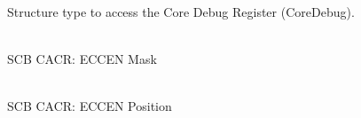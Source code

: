 \begin{DoxyRefList}
\label{deprecated__deprecated000557}%
%
Structure type to access the Core Debug Register (Core\+Debug).  
\item[{\parbox[t]{\linewidth}{Global \doxylink{group__CMSIS__SCB_ga7456a0b93710e8b9fa2b94c946e96c5c}{SCB\+\_\+\+CACR\+\_\+\+ECCEN\+\_\+\+Msk} }}]\hfill \\
\label{deprecated__deprecated000556}%
%
SCB CACR:\+ ECCEN Mask  
\item[{\parbox[t]{\linewidth}{Global \doxylink{group__CMSIS__SCB_ga76ce5adcbed2d2d8d425214a1e5d0579}{SCB\+\_\+\+CACR\+\_\+\+ECCEN\+\_\+\+Pos} }}]\hfill \\
\label{deprecated__deprecated000555}%
%
SCB CACR:\+ ECCEN Position 
\end{DoxyRefList}